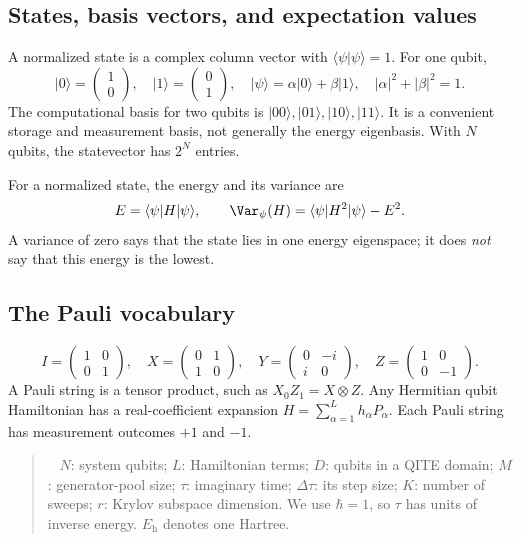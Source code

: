 \documentclass[11pt,a4paper]{article}
\newcommand{\ket}[1]{\lvert #1\rangle}
\newcommand{\bra}[1]{\langle #1\rvert}
\newcommand{\braket}[2]{\langle #1\vert #2\rangle}
\newcommand{\dt}{\Delta\tau}
\newcommand{\Eh}{E_{\mathrm h}}
\newenvironment{idea}[1][Main idea]{\par\smallskip\begin{quotation}\noindent{\bfseries\textcolor{keyblue}{#1.}}\ }{\end{quotation}\smallskip}
\begin{document}
\subsection*{States, basis vectors, and expectation values}
A normalized state is a complex column vector with $\braket{\psi}{\psi}=1$. For one qubit,
\[
\ket{0}=\begin{pmatrix}1\\0\end{pmatrix},\quad
\ket{1}=\begin{pmatrix}0\\1\end{pmatrix},\quad
\ket{\psi}=\alpha\ket{0}+\beta\ket{1},\quad
|\alpha|^2+|\beta|^2=1.
\]
The computational basis for two qubits is $\ket{00},\ket{01},\ket{10},\ket{11}$. It is a convenient storage and measurement basis, not generally the energy eigenbasis. With $N$ qubits, the statevector has $2^N$ entries.

For a normalized state, the energy and its variance are
\[
E=\bra{\psi}H\ket{\psi},\qquad
\Var_\psi(H)=\bra{\psi}H^2\ket{\psi}-E^2.
\]
A variance of zero says that the state lies in one energy eigenspace; it does \emph{not} say that this energy is the lowest.

\subsection*{The Pauli vocabulary}
\[
I=\begin{pmatrix}1&0\\0&1\end{pmatrix},\quad
X=\begin{pmatrix}0&1\\1&0\end{pmatrix},\quad
Y=\begin{pmatrix}0&-i\\i&0\end{pmatrix},\quad
Z=\begin{pmatrix}1&0\\0&-1\end{pmatrix}.
\]
A Pauli string is a tensor product, such as $X_0Z_1=X\otimes Z$. Any Hermitian qubit Hamiltonian has a real-coefficient expansion $H=\sum_{\alpha=1}^{L}h_\alpha P_\alpha$. Each Pauli string has measurement outcomes $+1$ and $-1$.

\begin{idea}[Notation used throughout]
$N$: system qubits; $L$: Hamiltonian terms; $D$: qubits in a QITE domain; $M$: generator-pool size; $\tau$: imaginary time; $\dt$: its step size; $K$: number of sweeps; $r$: Krylov subspace dimension. We use $\hbar=1$, so $\tau$ has units of inverse energy. $\Eh$ denotes one Hartree.
\end{idea}
\end{document}
